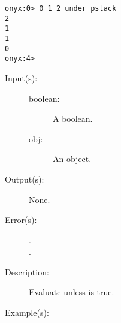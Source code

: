 \begin{description}
\begin{description}
\begin{verbatim}
onyx:0> 0 1 2 under pstack
2
1
1
0
onyx:4>
		\end{verbatim}
	\end{description}
\label{systemdict:unless}
\item[{\onyxop{boolean obj}{unless}{--}}: ]
	\begin{description}\item[]
	\item[Input(s): ]
		\begin{description}\item[]
		\item[boolean: ]
			A boolean.
		\item[obj: ]
			An object.
		\end{description}
	\item[Output(s): ] None.
	\item[Error(s): ]
		\begin{description}\item[]
		\item[.]
		\item[.]
		\end{description}
	\item[Description: ]
		Evaluate  unless  is true.
	\item[Example(s): ]\begin{verbatim}


\end{verbatim}
\end{description}
\end{description}
